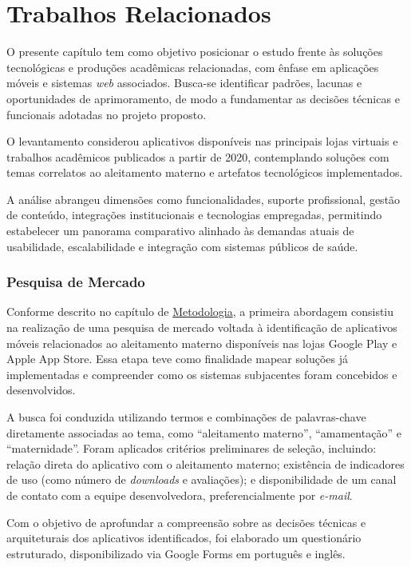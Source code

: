 \chapter{Trabalhos Relacionados}\label{cap_trabalhos_relacionados}

O presente capítulo tem como objetivo posicionar o estudo frente às soluções tecnológicas e produções acadêmicas relacionadas, com ênfase em aplicações móveis e sistemas \emph{web} associados. Busca-se identificar padrões, lacunas e oportunidades de aprimoramento, de modo a fundamentar as decisões técnicas e funcionais adotadas no projeto proposto.

O levantamento considerou aplicativos disponíveis nas principais lojas virtuais e trabalhos acadêmicos publicados a partir de 2020, contemplando soluções com temas correlatos ao aleitamento materno e artefatos tecnológicos implementados.

A análise abrangeu dimensões como funcionalidades, suporte profissional, gestão de conteúdo, integrações institucionais e tecnologias empregadas, permitindo estabelecer um panorama comparativo alinhado às demandas atuais de usabilidade, escalabilidade e integração com sistemas públicos de saúde.

\subsection{Pesquisa de Mercado}

Conforme descrito no capítulo de \hyperref[cap_metodologia]{Metodologia}, a primeira abordagem consistiu na realização de uma pesquisa de mercado voltada à identificação de aplicativos móveis relacionados ao aleitamento materno disponíveis nas lojas Google Play e Apple App Store. Essa etapa teve como finalidade mapear soluções já implementadas e compreender como os sistemas subjacentes foram concebidos e desenvolvidos.

A busca foi conduzida utilizando termos e combinações de palavras-chave diretamente associadas ao tema, como ``aleitamento materno'', ``amamentação'' e ``maternidade''. Foram aplicados critérios preliminares de seleção, incluindo: relação direta do aplicativo com o aleitamento materno; existência de indicadores de uso (como número de \emph{downloads} e avaliações); e disponibilidade de um canal de contato com a equipe desenvolvedora, preferencialmente por \emph{e-mail}.

Com o objetivo de aprofundar a compreensão sobre as decisões técnicas e arquiteturais dos aplicativos identificados, foi elaborado um questionário estruturado, disponibilizado via Google Forms em português e inglês. 

